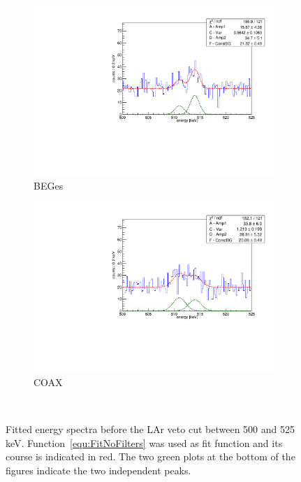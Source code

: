 \documentclass[encoding=utf8,british]{tumphthesis}
\begin{document}
\begin{figure}[t!]
	\centering
	\begin{subfigure}{.5\textwidth}
		\centering
		\includegraphics[width=\textwidth]{./Bilder/500525FitNoFilterBEGes.pdf}
		\caption{BEGes}
		\label{fig:FitNoFilterBEGes}
	\end{subfigure}\hfill%
	\begin{subfigure}{.5\textwidth}
		\centering
		\includegraphics[width=\textwidth]{./Bilder/500525FitNoFilterCOAX.pdf}
		\caption{COAX}
		\label{fig:FitNoFilterCOAX}
	\end{subfigure}
    \\
	\caption{
		Fitted energy spectra before the LAr veto cut between 500 and 525 keV. 
		Function~\ref{equ:FitNoFilters} was used as fit function and its course is indicated in red. 
		The two green plots at the bottom of the figures indicate the two independent peaks. 
		}
\end{figure}
\\
\end{document}
